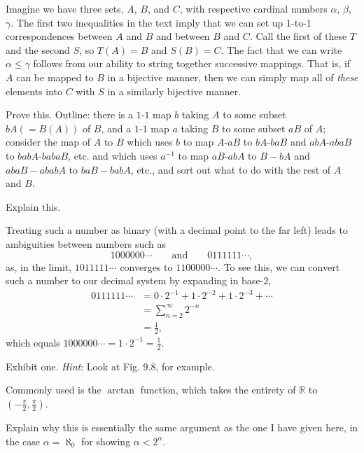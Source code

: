 \documentclass[../the-road-to-reality.tex]{subfiles}
\begin{document}
\begin{questions}
	\begin{solution}
		Imagine we have three sets, $A$, $B$, and $C$, with respective cardinal numbers $\alpha$, $\beta$, $\gamma$. The first two inequalities in the text imply that we can set up $1$-to-$1$ correspondences between $A$ and $B$ and between $B$ and $C$. Call the first of these $T$ and the second $S$, so $T(A) = B$ and $S(B) = C$. The fact that we can write $\alpha \leq \gamma$ follows from our ability to string together successive mappings. That is, if $A$ can be mapped to $B$ in a bijective manner, then we can simply map all of \textit{these} elements into $C$ with $S$ in a similarly bijective manner.
	\end{solution}

	\question Prove this. Outline: there is a $1$-$1$ map $b$ taking $A$ to some subset $bA (=B(A))$ of $B$, and a $1$-$1$ map $a$ taking $B$ to some subset $aB$ of $A$; consider the map of $A$ to $B$ which uses $b$ to map $A$-$aB$ to $bA$-$baB$ and $abA$-$abaB$ to $babA$-$babaB$, etc. and which uses $a^{-1}$ to map $aB$-$abA$ to $B-bA$ and $abaB-ababA$ to $baB-babA$, etc., and sort out what to do with the rest of $A$ and $B$.

	\question Explain this.

	\begin{solution}
		Treating such a number as binary (with a decimal point to the far left) leads to ambiguities between numbers such as 
		\[
			1000000\cdots \qquad \text{and} \qquad 0111111\cdots
		,\] 
		as, in the limit, $1011111\cdots$ converges to $1100000\cdots$. To see this, we can convert such a number to our decimal system by expanding in base-$2$,
		\begin{align*}
			0111111\cdots &= 0\cdot{2}^{-1} + 1\cdot{2}^{-2} + 1\cdot{2}^{-3} + \cdots \\
				      &= \sum_{n=2}^{\infty}2^{-n} \\
				      &= \frac{1}{2},
		\end{align*}
		which equals $1000000\cdots = 1\cdot{2}^{-1} = \frac{1}{2}$.
	\end{solution}

	\question Exhibit one. \textit{Hint}: Look at Fig. 9.8, for example.

	\begin{solution}
		Commonly used is the $\arctan$ function, which takes the entirety of $\mathbb{R}$ to $(-\frac{\pi}{2}, \frac{\pi}{2})$.
	\end{solution}

	\question Explain why this is essentially the same argument as the one I have given here, in the case $\alpha = \aleph_0$ for showing $\alpha < 2^\alpha$.


\end{questions}
\end{document}
